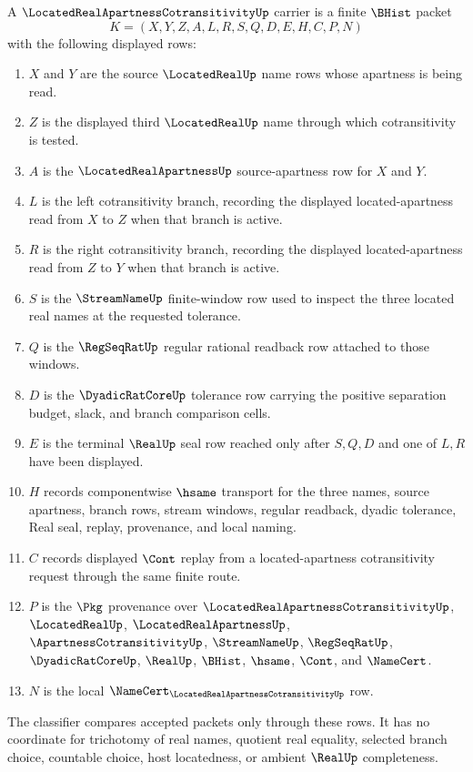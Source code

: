 \begin{definition}
\label{def:located-real-apartness-cotransitivity-carrier}
A $\LocatedRealApartnessCotransitivityUp$ carrier is a finite $\BHist$ packet
$$
K=(X,Y,Z,A,L,R,S,Q,D,E,H,C,P,N)
$$
with the following displayed rows:
\begin{enumerate}
\item $X$ and $Y$ are the source $\LocatedRealUp$ name rows whose apartness is being read.
\item $Z$ is the displayed third $\LocatedRealUp$ name through which cotransitivity is tested.
\item $A$ is the $\LocatedRealApartnessUp$ source-apartness row for $X$ and $Y$.
\item $L$ is the left cotransitivity branch, recording the displayed located-apartness read from $X$ to $Z$ when that branch is active.
\item $R$ is the right cotransitivity branch, recording the displayed located-apartness read from $Z$ to $Y$ when that branch is active.
\item $S$ is the $\StreamNameUp$ finite-window row used to inspect the three located real names at the requested tolerance.
\item $Q$ is the $\RegSeqRatUp$ regular rational readback row attached to those windows.
\item $D$ is the $\DyadicRatCoreUp$ tolerance row carrying the positive separation budget, slack, and branch comparison cells.
\item $E$ is the terminal $\RealUp$ seal row reached only after $S,Q,D$ and one of $L,R$ have been displayed.
\item $H$ records componentwise $\hsame$ transport for the three names, source apartness, branch rows, stream windows, regular readback, dyadic tolerance, Real seal, replay, provenance, and local naming.
\item $C$ records displayed $\Cont$ replay from a located-apartness cotransitivity request through the same finite route.
\item $P$ is the $\Pkg$ provenance over $\LocatedRealApartnessCotransitivityUp$, $\LocatedRealUp$, $\LocatedRealApartnessUp$, $\ApartnessCotransitivityUp$, $\StreamNameUp$, $\RegSeqRatUp$, $\DyadicRatCoreUp$, $\RealUp$, $\BHist$, $\hsame$, $\Cont$, and $\NameCert$.
\item $N$ is the local $\NameCert_{\LocatedRealApartnessCotransitivityUp}$ row.
\end{enumerate}
The classifier compares accepted packets only through these rows. It has no coordinate for trichotomy of real names, quotient real equality, selected branch choice, countable choice, host locatedness, or ambient $\RealUp$ completeness.
\end{definition}

